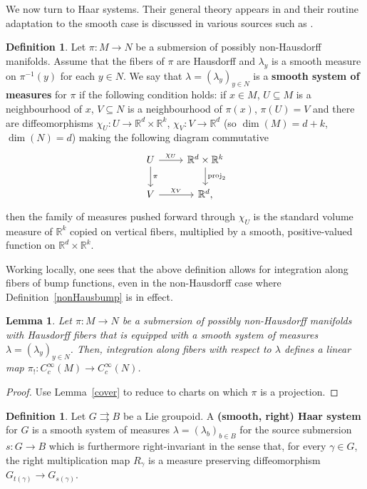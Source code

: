 \documentclass[12pt]{article}
\theoremstyle{plain}
\newtheorem{lemma}[thm]{Lemma}
\theoremstyle{definition}
\newtheorem{defn}[thm]{Definition}
\newcommand{\R}{\mathbb{R}}
\numberwithin{equation}{section}
\begin{document}
We now turn to Haar systems. Their general theory appears in \cite{Renault[BOOK]} and their routine adaptation to the smooth case is discussed  in various sources such as   \cite{Brylinski-Nistor}.




\begin{defn}
Let $\pi : M \to N$ be a submersion of possibly non-Hausdorff manifolds. Assume that the fibers of $\pi$ are Hausdorff and $\lambda_y$ is a smooth measure on $\pi^{-1}(y)$ for each $y \in N$. We say that $\lambda=(\lambda_y)_{y \in N}$ is a \textbf{smooth system of measures} for $\pi$ if the following condition holds: if  $x \in M$,  $U \subseteq M$ is a neighbourhood of $x$, $V \subseteq N$ is a neighbourhood of $\pi(x)$, $\pi(U)=V$ and there are diffeomorphisms $\chi_U : U \to  \R^d \times \R^k$, $\chi_V : V \to \R^d$  (so  $\dim(M)=d+k$, $\dim(N)=d$) making the following diagram commutative
\[\begin{tikzcd}
U \ar[r,"{\chi_U}"] \ar[d,"\pi"] & \R^d \times \R^k \ar[d,"{\mathrm{proj}_2}"]  \\
V \ar[r,"{\chi_V}"] & \R^d, 
\end{tikzcd} \]
then the family of measures pushed forward through $\chi_U$ is the standard volume measure of $\R^k$ copied on vertical fibers, multiplied by a smooth, positive-valued function on $\R^d \times \R^k$.
\end{defn}

Working locally, one sees that  the above definition allows for integration along fibers of bump functions, even in the non-Hausdorff case where Definition~\ref{nonHausbump} is in effect. 

\begin{lemma}
Let $\pi : M \to N$ be a submersion of possibly non-Hausdorff manifolds with Hausdorff fibers that is  equipped with a  smooth system of measures $\lambda = (\lambda_y)_{y \in N}$. Then, integration  along fibers with respect to $\lambda$ defines a linear map $\pi_!: C_c^\infty(M) \to C_c^\infty(N)$.
\end{lemma}
\begin{proof}
Use Lemma~\ref{cover} to reduce to charts on which $\pi$ is a projection.
\end{proof}






\begin{defn}
Let $G \rightrightarrows B$ be a Lie groupoid. A \textbf{(smooth, right) Haar system} for $G$ is a smooth system of measures $\lambda = (\lambda_b)_{b \in B}$ for the source submersion $s : G \to B$ which is furthermore right-invariant in the sense that, for every $\gamma \in G$, the right multiplication map $R_\gamma$ is a measure preserving diffeomorphism $G_{t(\gamma)} \to G_{s(\gamma)}$.
\end{defn}
\end{document}
